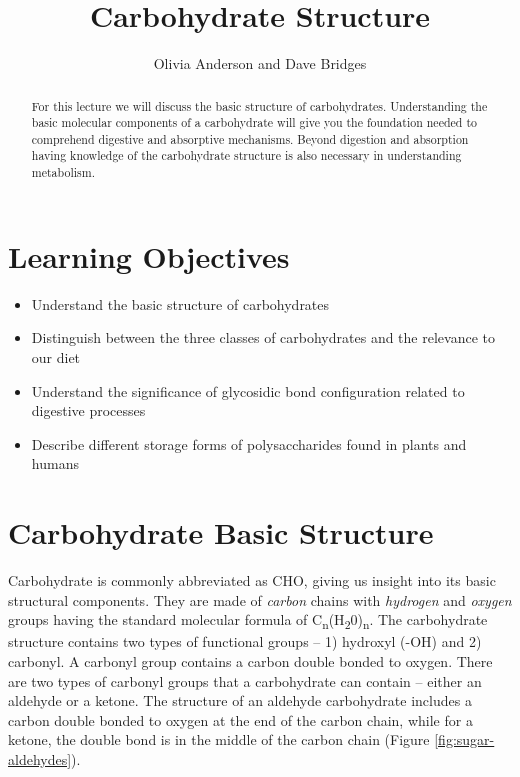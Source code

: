 \documentclass{tufte-handout}
\title{Carbohydrate Structure}
\author{Olivia Anderson and Dave Bridges}
\date{}  %
\begin{document}
\maketitle%

\begin{abstract}
For this lecture we will discuss the basic structure of carbohydrates. Understanding the basic molecular components of a carbohydrate will give you the foundation needed to comprehend digestive and absorptive mechanisms. Beyond digestion and absorption having knowledge of the carbohydrate structure is also necessary in understanding metabolism. 
\end{abstract}

\tableofcontents


\pagebreak

\section{Learning Objectives}

\begin{itemize}
\item Understand the basic structure of carbohydrates
\item Distinguish between the three classes of carbohydrates and the relevance to our diet
\item Understand the significance of glycosidic bond configuration related to digestive processes
\item Describe different storage forms of polysaccharides found in plants and humans
\end{itemize}

\section{Carbohydrate Basic Structure}\label{carbohydrate-basic-structure}

Carbohydrate is commonly abbreviated as CHO, giving us insight into its basic structural components. They are made of \emph{carbon} chains with \emph{hydrogen} and \emph{oxygen} groups having the standard molecular formula of C\textsubscript{n}(H\textsubscript{2}0)\textsubscript{n}. The carbohydrate structure contains two types of functional groups -- 1) hydroxyl (-OH) and 2) carbonyl. A carbonyl group contains a carbon double bonded to oxygen. There are two types of carbonyl groups that a carbohydrate can contain -- either an aldehyde or a ketone. The structure of an aldehyde carbohydrate includes a carbon double bonded to oxygen at the end of the carbon chain, while for a ketone, the double bond is in the middle of the carbon chain (Figure \ref{fig:sugar-aldehydes}).
\end{document}
